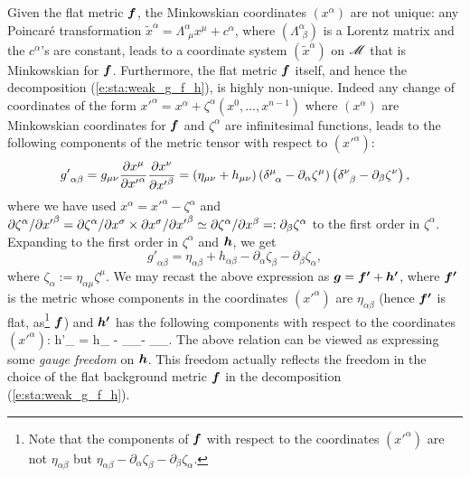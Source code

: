 Given the flat metric $\bm{f}$, the Minkowskian coordinates $(x^\alpha)$
are not unique: any Poincaré transformation\label{p:sta:Poincare_transf}
${\tilde x}^\alpha = \Lambda^\alpha_{\ \, \mu} x^\mu + c^\alpha$, where
$(\Lambda^\alpha_{\ \, \beta})$ is a Lorentz matrix and the $c^\alpha$'s are
constant, leads to a coordinate system $({\tilde x}^\alpha)$ on $\mathscr{M}$ that is Minkowskian for $\bm{f}$.
Furthermore, the flat metric $\bm{f}$ itself, and hence the decomposition (\ref{e:sta:weak_g_f_h}), is
highly non-unique.
Indeed any change of coordinates of the form ${x'}^\alpha = x^\alpha + \zeta^\alpha(x^0,\ldots,x^{n-1})$
where $(x^\alpha)$ are Minkowskian coordinates for $\bm{f}$ and $\zeta^\alpha$ are infinitesimal functions,
leads to the following components of the metric tensor with respect to $({x'}^\alpha)$:
\[
    {g'}_{\alpha\beta} = g_{\mu\nu} \frac{\partial x^\mu}{\partial {x'}^\alpha} \frac{\partial x^\nu}{\partial {x'}^\beta}
    = \left( \eta_{\mu\nu} + h_{\mu\nu}\right) \left( \delta^\mu_{\ \, \alpha} - \partial_\alpha \zeta^\mu \right)
     \left( \delta^\nu_{\ \, \beta} - \partial_\beta \zeta^\nu \right) ,
\]
where we have used $x^\alpha = {x'}^\alpha - \zeta^\alpha$
and ${\partial \zeta^\alpha}/{\partial {x'}^\beta} = {\partial \zeta^\alpha}/{\partial x^\sigma} \times {\partial x^\sigma}/{\partial {x'}^\beta} \simeq
{\partial \zeta^\alpha}/{\partial x^\beta} =: \partial_\beta \zeta^\alpha$ to the first order in $\zeta^\alpha$.
Expanding to the first order in $\zeta^\alpha$ and $\bm{h}$, we get
\[
    {g'}_{\alpha\beta}  = \eta_{\alpha\beta} + h_{\alpha\beta}
    - \partial_\alpha \zeta_\beta - \partial_\beta \zeta_\alpha ,
\]
where $\zeta_\alpha := \eta_{\alpha\mu} \zeta^\mu$.
We may recast the above expression as
$\bm{g} = \bm{f'} + \bm{h'}$,
where $\bm{f'}$ is the metric whose components in the coordinates $({x'}^\alpha)$ are
$\eta_{\alpha\beta}$ (hence $\bm{f'}$ is flat, as\footnote{Note that
the components of $\bm{f}$ with respect to the coordinates $({x'}^\alpha)$ are not $\eta_{\alpha\beta}$
but $\eta_{\alpha\beta} - \partial_\alpha \zeta_\beta - \partial_\beta \zeta_\alpha$.} $\bm{f}$)
and $\bm{h'}$ has the following components with respect to the coordinates $({x'}^\alpha)$:
\be \label{e:sta:hprime_h_zeta}
    {h'}_{\alpha\beta} = h_{\alpha\beta} - \partial_\alpha \zeta_\beta - \partial_\beta \zeta_\alpha .
\ee
The above relation can be viewed as expressing some \emph{gauge freedom} on
$\bm{h}$. This freedom actually reflects the freedom in the choice of the flat background metric $\bm{f}$ in the
decomposition (\ref{e:sta:weak_g_f_h}).


